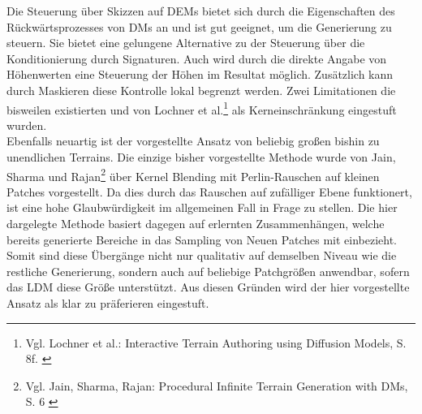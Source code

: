 Die Steuerung über Skizzen auf \ac{DEM}s bietet sich durch die Eigenschaften des Rückwärtsprozesses von \ac{DM}s an und ist gut geeignet, um die Generierung zu steuern. Sie bietet eine gelungene Alternative zu der Steuerung über die Konditionierung durch Signaturen. Auch wird durch die direkte Angabe von Höhenwerten eine Steuerung der Höhen im Resultat möglich. Zusätzlich kann durch Maskieren diese Kontrolle lokal begrenzt werden. Zwei Limitationen die bisweilen existierten und von Lochner et al.\footnote{
    Vgl. Lochner et al.: Interactive Terrain Authoring using Diffusion Models, S. 8f.
    \cite{lochner2023interactive}
} als Kerneinschränkung eingestuft wurden. \\
Ebenfalls neuartig ist der vorgestellte Ansatz von beliebig großen bishin zu unendlichen Terrains. Die einzige bisher vorgestellte Methode wurde von Jain, Sharma und Rajan\footnote{
    Vgl. Jain, Sharma, Rajan: Procedural Infinite Terrain Generation with DMs, S. 6
    \cite{jain2022adaptive}
} über Kernel Blending mit Perlin-Rauschen auf kleinen Patches vorgestellt. Da dies durch das Rauschen auf zufälliger Ebene funktionert, ist eine hohe Glaubwürdigkeit im allgemeinen Fall in Frage zu stellen. Die hier dargelegte Methode basiert dagegen auf erlernten Zusammenhängen, welche bereits generierte Bereiche in das Sampling von Neuen Patches mit einbezieht. Somit sind diese Übergänge nicht nur qualitativ auf demselben Niveau wie die restliche Generierung, sondern auch auf beliebige Patchgrößen anwendbar, sofern das \ac{LDM} diese Größe unterstützt. Aus diesen Gründen wird der hier vorgestellte Ansatz als klar zu präferieren eingestuft.  

